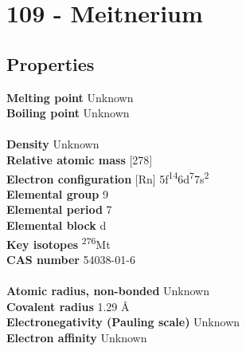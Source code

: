 \section{109 - Meitnerium}
\label{sec:elem-meitnerium}
\subsection{Properties}
\textbf{Melting point} Unknown\\
\textbf{Boiling point} Unknown\\
\\
\textbf{Density} Unknown\\
\textbf{Relative atomic mass} [278]\\
\textbf{Electron configuration} [Rn] 5f\textsuperscript{14}6d\textsuperscript{7}7s\textsuperscript{2}\\
\textbf{Elemental group} 9\\
\textbf{Elemental period} 7\\
\textbf{Elemental block} d\\
\textbf{Key isotopes} \textsuperscript{276}Mt\\
\textbf{CAS number} 54038-01-6\\
\\
\textbf{Atomic radius, non-bonded} Unknown\\
\textbf{Covalent radius} 1.29 Å\\
\textbf{Electronegativity (Pauling scale)} Unknown\\
\textbf{Electron affinity} Unknown\\